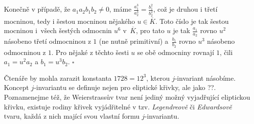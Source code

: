 \documentclass [12pt]{report}
\begin{document}
Konečně v případě, že $a_1 a_2 b_1 b_2 \neq 0$, máme $\frac{a_1^3}{a_2^3} = \frac{b_1^2}{b_2^2}$, což je druhou i třetí mocninou, tedy i šestou mocninou nějakého $u \in \overline{K}$. Toto číslo je tak šestou mocninou i~všech šestých odmocnin $u^6$ v~$\overline{K}$, pro tato $u$ je tak $\frac{a_1}{a_2}$ rovno $u^2$ násobeno třetí odmocninou z $1$ (ne nutně primitivní) a~$\frac{b_1}{b_2}$ rovno $u^3$ násobeno odmocninou z $1$. Pro nějaké z těchto šesti $u$ se obě odmocniny rovnají $1$, čili $a_1 = u^2 a_2$ a $b_1 = u^3 b_2$. \hfill $\square$\\

\begin{poznamka}
Čtenáře by mohla zarazit konstanta $1728 = 12^3$, kterou $j$-invariant násobíme. Koncept $j$-invariantu se definuje nejen pro eliptické křivky, ale jako ??. Poznamenejme též, že Weierstrassův tvar není jediný možný vyjadřující eliptickou křivku, existuje rodiny křivek vyjádřitelné v tzv. \textit{Legendreově} či \textit{Edwardsově} tvaru, každá z nich mající svou vlastní formu $j$-invariantu. 
\end{poznamka}
\end{document}
